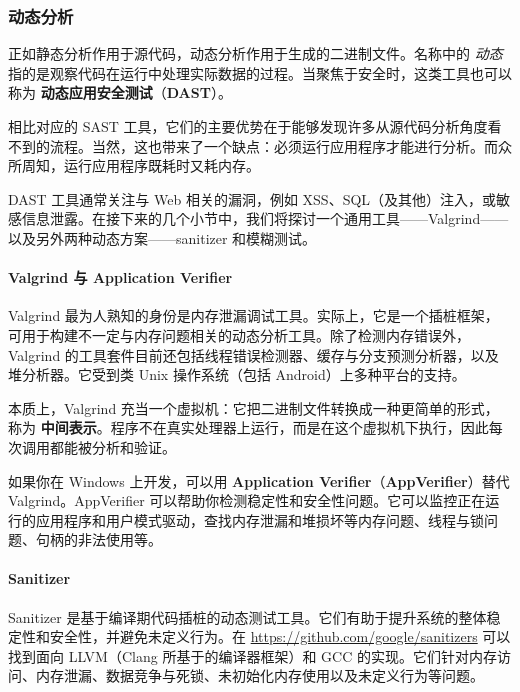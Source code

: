 \subsubsection{动态分析}

\label{idx:1093}
\label{idx:1094}
正如静态分析作用于源代码，动态分析作用于生成的二进制文件。名称中的 \emph{动态} 指的是观察代码在运行中处理实际数据的过程。当聚焦于安全时，这类工具也可以称为 \textbf{动态应用安全测试}（\textbf{DAST}）。

相比对应的 SAST 工具，它们的主要优势在于能够发现许多从源代码分析角度看不到的流程。当然，这也带来了一个缺点：必须运行应用程序才能进行分析。而众所周知，运行应用程序既耗时又耗内存。

DAST 工具通常关注与 Web 相关的漏洞，例如 XSS、SQL（及其他）注入，或敏感信息泄露。在接下来的几个小节中，我们将探讨一个通用工具——Valgrind——以及另外两种动态方案——sanitizer 和模糊测试。

\paragraph{Valgrind 与 Application Verifier}

\label{idx:1095}
\label{idx:1096}
\label{idx:1097}
Valgrind 最为人熟知的身份是内存泄漏调试工具。实际上，它是一个插桩框架，可用于构建不一定与内存问题相关的动态分析工具。除了检测内存错误外，Valgrind 的工具套件目前还包括线程错误检测器、缓存与分支预测分析器，以及堆分析器。它受到类 Unix 操作系统（包括 Android）上多种平台的支持。

\label{idx:1098}
本质上，Valgrind 充当一个虚拟机：它把二进制文件转换成一种更简单的形式，称为 \textbf{中间表示}。程序不在真实处理器上运行，而是在这个虚拟机下执行，因此每次调用都能被分析和验证。

\label{idx:1099}
如果你在 Windows 上开发，可以用 \textbf{Application Verifier}（\textbf{AppVerifier}）替代 Valgrind。AppVerifier 可以帮助你检测稳定性和安全性问题。它可以监控正在运行的应用程序和用户模式驱动，查找内存泄漏和堆损坏等内存问题、线程与锁问题、句柄的非法使用等。

\paragraph{Sanitizer}

\label{idx:1100}
\label{idx:1101}
Sanitizer 是基于编译期代码插桩的动态测试工具。它们有助于提升系统的整体稳定性和安全性，并避免未定义行为。在 \href{https://github.com/google/sanitizers}{https://github.com/google/sanitizers} 可以找到面向 LLVM（Clang 所基于的编译器框架）和 GCC 的实现。它们针对内存访问、内存泄漏、数据竞争与死锁、未初始化内存使用以及未定义行为等问题。

